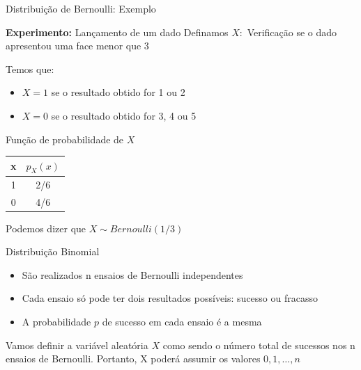 \begin{frame}{Distribuição de Bernoulli: Exemplo}
    \begin{exemplo}[13]
        \textbf{Experimento:} Lançamento de um dado 
        Definamos $X:$ Verificação se o dado apresentou uma face menor que 3

        Temos que:
        \begin{itemize}
            \item $X = 1$ se o resultado obtido for 1 ou 2
            \item $X= 0 $ se o resultado obtido for 3, 4 ou 5
        \end{itemize}

        Função de probabilidade de $X$
        \pause
        \begin{table}[H]
\begin{tabular}{cc}
\hline
x & $p_X(x)$ \\ \hline
1 & 2/6      \\
0 & 4/6      \\ \hline
\end{tabular}
\end{table}

Podemos dizer que $X \sim Bernoulli(1/3)$
    \end{exemplo}
\end{frame}
\begin{frame}{Distribuição Binomial}

    \begin{itemize}
        \item São realizados n ensaios de Bernoulli independentes
        \item Cada ensaio só pode ter dois resultados possíveis: sucesso ou fracasso
        \item A probabilidade $p$ de sucesso em cada ensaio é a mesma
    \end{itemize}

    Vamos definir a variável aleatória $X$ como sendo o número total de sucessos nos n ensaios de Bernoulli. Portanto, X poderá assumir os valores $0, 1, \dots, n$
\end{frame}

